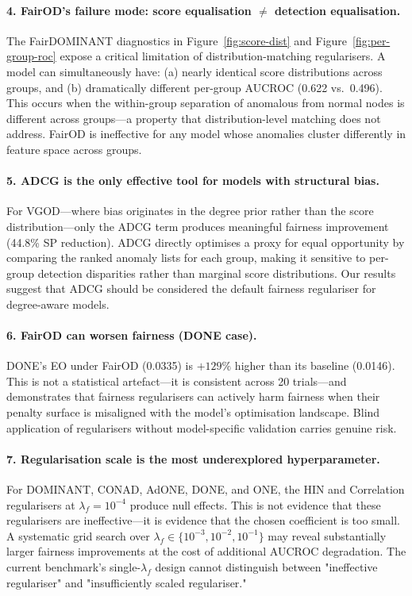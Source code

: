 \documentclass[sigconf,natbib=false]{acmart}
\begin{document}
\paragraph{4. FairOD's failure mode: score equalisation $\neq$ detection equalisation.}
The FairDOMINANT diagnostics in Figure~\ref{fig:score-dist} and Figure~\ref{fig:per-group-roc} expose a critical limitation of distribution-matching regularisers. A model can simultaneously have: (a) nearly identical score distributions across groups, and (b) dramatically different per-group AUCROC (0.622 vs.\ 0.496). This occurs when the within-group separation of anomalous from normal nodes is different across groups—a property that distribution-level matching does not address. FairOD is ineffective for any model whose anomalies cluster differently in feature space across groups.

\paragraph{5. ADCG is the only effective tool for models with structural bias.}
For VGOD—where bias originates in the degree prior rather than the score distribution—only the ADCG term produces meaningful fairness improvement (44.8\% SP reduction). ADCG directly optimises a proxy for equal opportunity by comparing the ranked anomaly lists for each group, making it sensitive to per-group detection disparities rather than marginal score distributions. Our results suggest that ADCG should be considered the default fairness regulariser for degree-aware models.

\paragraph{6. FairOD can worsen fairness (DONE case).}
DONE's EO under FairOD (0.0335) is $+129\%$ higher than its baseline (0.0146). This is not a statistical artefact—it is consistent across 20 trials—and demonstrates that fairness regularisers can actively harm fairness when their penalty surface is misaligned with the model's optimisation landscape. Blind application of regularisers without model-specific validation carries genuine risk.

\paragraph{7. Regularisation scale is the most underexplored hyperparameter.}
For DOMINANT, CONAD, AdONE, DONE, and ONE, the HIN and Correlation regularisers at $\lambda_f = 10^{-4}$ produce null effects. This is not evidence that these regularisers are ineffective—it is evidence that the chosen coefficient is too small. A systematic grid search over $\lambda_f \in \{10^{-3}, 10^{-2}, 10^{-1}\}$ may reveal substantially larger fairness improvements at the cost of additional AUCROC degradation. The current benchmark's single-$\lambda_f$ design cannot distinguish between "ineffective regulariser" and "insufficiently scaled regulariser."
\end{document}
